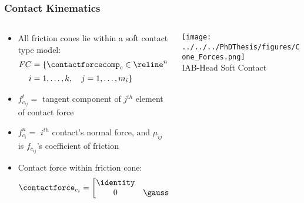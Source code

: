 \begin{frame}
	\frametitle{Contact Kinematics}
	\begin{columns}[c]
		\begin{column}{.45\textwidth}
			\centering
			\begin{itemize}
				\tiny
				\vspace{0.1in}
				\item All friction cones lie within a soft contact type model:~\cite{Nguyen1988}
				\begin{align}
					FC &= \{\contactforcecomp_{c} \in \reline^n: \|f^t_{c_{ij}}\| \le \mu_{ij}\|f_{c_i}^n\|, \nonumber \\
					 i&=1, \ldots,k, \quad j=1,\ldots, m_i  \}
				\end{align}
				\item $f_{c_{ij}}^t = $  tangent component of $j^{th}$ element of contact force
				\vspace{0.1in}
				\item $f_{c_i}^n = $ $i^{th}$ contact's normal force, and $\mu_{ij}$ is $f_{c_{ij}}$'s coefficient of friction
				\vspace{0.1in}
				\item Contact force within friction cone:
				\begin{align}
				\contactforce_{c_i} = \begin{bmatrix}
				\identity & {0}\\
				{0} & \gaussianmap_{c_i}
				\end{bmatrix}
				\begin{bmatrix}
				\contactforcecomp_{c_i} \\ \contacttorquecomp_{c_i}
				\end{bmatrix},
				\label{eq:soft_contact}
				\end{align}
			\end{itemize}
		\end{column}
		\begin{column}{0.65\textwidth}
			\texttt{[image: ../../../PhDThesis/figures/Cone\_Forces.png]}\\
			\tiny \centering IAB-Head Soft Contact
		\end{column}
	\end{columns}
\end{frame}

